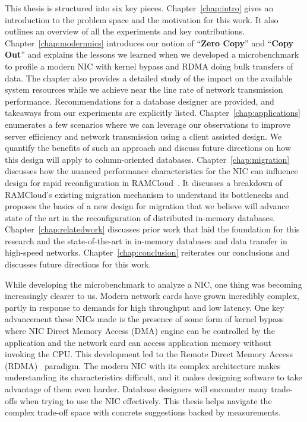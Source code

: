 This thesis is structured into six key pieces. 
Chapter~\ref{chap:intro} gives an introduction to the problem space and the motivation for this work. 
It also outlines an overview of all the experiments and key contributions. Chapter~\ref{chap:modernnics} introduces 
our notion of \enquote{\textbf{Zero Copy}} and \enquote{\textbf{Copy Out}} and explains 
the lessons we learned when we developed a microbenchmark to profile a modern NIC with kernel bypass and RDMA doing bulk transfers 
of data. The chapter also provides a detailed study of the impact on the available system resources while we achieve 
near the line rate of network transmission performance. Recommendations for a database designer are provided, and takeaways 
from our experiments are explicitly listed. Chapter~\ref{chap:applications} enumerates a few scenarios where we can 
leverage our observations to improve server efficiency and network transmission using a client assisted design.
 We quantify the benefits of such an approach and discuss future directions on how this design will apply to column-oriented 
 databases. Chapter~\ref{chap:migration} discusses how the nuanced performance characteristics for the NIC can influence 
design for rapid reconfiguration in RAMCloud~\cite{ramcloud}. It discusses a breakdown of RAMCloud's existing migration mechanism to understand its bottlenecks
and proposes the basics of a new design for migration that we believe will advance state of the art
in the reconfiguration of distributed in-memory databases. Chapter~\ref{chap:relatedwork} discusses prior work that laid the 
foundation for this research and the state-of-the-art in in-memory databases and data transfer in high-speed networks. 
Chapter~\ref{chap:conclusion} reiterates our conclusions and discusses future directions for this work.

While developing the microbenchmark to analyze a NIC, one thing was becoming increasingly clearer to us.
Modern network cards have grown incredibly complex, partly in response to
demands for high throughput and low latency. One key advancement these NICs made 
is the presence of some form of kernel bypass where NIC Direct Memory Access (DMA) engine can be 
controlled by the application and the network card can access application memory without invoking the CPU. 
This development led to the Remote Direct Memory Access (RDMA)~\cite{rdmapatent} paradigm. 
The modern NIC with its complex architecture makes understanding its characteristics difficult, 
and it makes designing software to take advantage of them even harder. 
Database designers will encounter many trade-offs when trying to use the NIC effectively. 
This thesis helps navigate the complex trade-off space with concrete suggestions backed by measurements.

